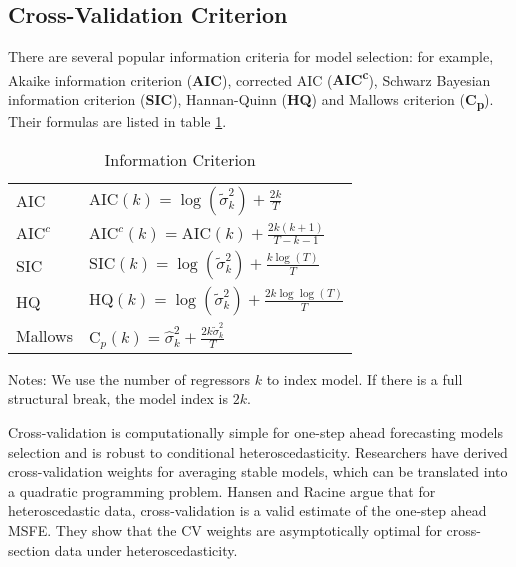\subsection{Cross-Validation Criterion}
There are several popular information criteria for model selection: for example, Akaike information criterion (\textbf{AIC}), corrected AIC (\textbf{AIC\textsuperscript{c}}), Schwarz Bayesian information criterion (\textbf{SIC}), Hannan-Quinn (\textbf{HQ}) and Mallows criterion (\textbf{C\textsubscript{p}}). Their formulas are listed in table \ref{tb:1}.
\begin{table}
\centering
\caption{Information Criterion} \label{tb:1}
\begin{threeparttable}
\begin{tabular}{ll}
\toprule
AIC                 & $\mathrm{AIC}(k) = \log{(\tilde{\sigma}^{2}_{k})} + \frac{2k}{T}$ \\[0.4em]
$\mathrm{AIC}^{c}$  & $\mathrm{AIC}^{c}(k) = \mathrm{AIC}(k) + \frac{2k(k+1)}{T-k-1}$ \\[0.4em]
SIC                 & $\mathrm{SIC}(k) = \log{(\tilde{\sigma}^{2}_{k})} + \frac{k\log{(T)}}{T}$ \\[0.4em]
HQ                  & $\mathrm{HQ}(k) = \log{(\tilde{\sigma}^{2}_{k})} + \frac{2k\log{\log(T)}}{T}$ \\[0.4em]
Mallows            & $\mathrm{C}_{p}(k) = \hat{\sigma}^{2}_{k} + \frac{2k\tilde{\sigma}^{2}_{k}}{T}$\\
\bottomrule
\end{tabular}
\begin{tablenotes} \footnotesize
Notes: We use the number of regressors $k$ to index model. If there is a full structural break, the model index is $2k$.
\end{tablenotes}
\end{threeparttable}
\end{table}

Cross-validation is computationally simple for one-step ahead forecasting models selection and is robust to conditional heteroscedasticity. Researchers have derived cross-validation weights for averaging stable models, which can be translated into a quadratic programming problem. Hansen and Racine \cite{hansen2011jackknife} argue that for heteroscedastic data, cross-validation is a valid estimate of the one-step ahead MSFE. They show that the CV weights are asymptotically optimal for cross-section data under heteroscedasticity.

